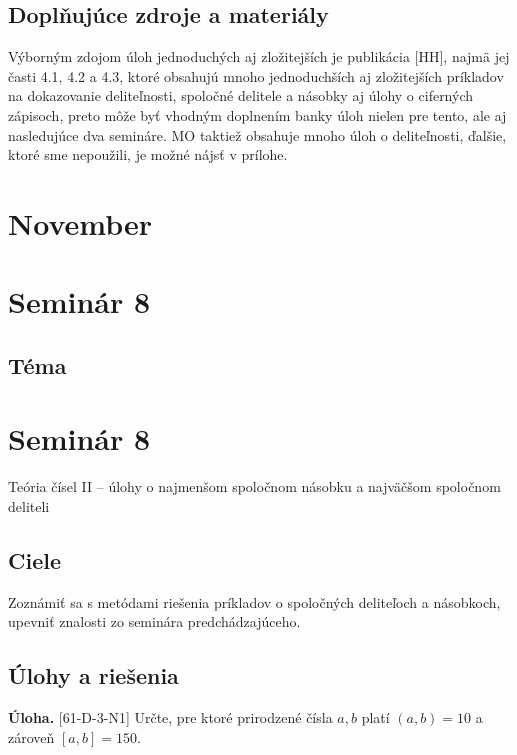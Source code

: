 \documentclass[11pt,a4paper,oneside,final]{book}
\newcommand{\ul}{\textbf{Úloha.} }
\begin{document}
\subsection*{Doplňujúce zdroje a materiály}
Výborným zdojom úloh jednoduchých aj zložitejších je publikácia [HH], najmä jej časti 4.1, 4.2 a 4.3, ktoré obsahujú mnoho jednoduchších aj zložitejších príkladov na dokazovanie deliteľnosti, spoločné delitele a násobky aj úlohy o ciferných zápisoch, preto môže byť vhodným doplnením banky úloh nielen pre tento, ale aj nasledujúce dva semináre. MO taktiež obsahuje mnoho úloh o deliteľnosti, ďalšie, ktoré sme nepoužili, je možné nájsť v prílohe.


\newpage
\section{November}
\section*{Seminár 8}
\subsection*{Téma}\section*{Seminár 8}
Teória čísel II -- úlohy o najmenšom spoločnom násobku a najväčšom spoločnom deliteli

\subsection*{Ciele}
Zoznámiť sa s metódami riešenia príkladov o spoločných deliteľoch a násobkoch, upevniť znalosti zo seminára predchádzajúceho.

\subsection*{Úlohy a riešenia}
\begin{tcolorbox}[breakable,notitle,boxrule=0pt,colback=light-gray,colframe=light-gray]\ul [61-D-3-N1] Určte, pre ktoré prirodzené čísla $a, b$ platí $(a, b) = 10$ a zároveň  $[a, b] = 150$.

\end{tcolorbox}
\end{document}
